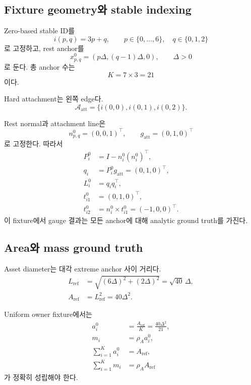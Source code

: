 \documentclass[11pt]{article}
\begin{document}
\subsection{Fixture geometry와 stable indexing}

Zero-based stable ID를
\begin{equation}
  i(p,q)=3p+q,
  \qquad
  p\in\{0,\ldots,6\},\quad q\in\{0,1,2\}
\end{equation}
로 고정하고, rest anchor를
\begin{equation}
  x_{p,q}^0
  =
  \left(p\Delta,(q-1)\Delta,0\right),
  \qquad \Delta>0
\end{equation}
로 둔다. 총 anchor 수는
\begin{equation}
  K=7\times3=21
\end{equation}
이다.

Hard attachment는 왼쪽 edge다.
\begin{equation}
  \mathcal A_{\mathrm{att}}
  =
  \{i(0,0),i(0,1),i(0,2)\}.
\end{equation}

Rest normal과 attachment line은
\begin{equation}
  n_{p,q}^0=(0,0,1)^\top,
  \qquad
  g_{\mathrm{att}}=(0,1,0)^\top
\end{equation}
로 고정한다. 따라서
\begin{align}
  P_i^0&=I-n_i^0(n_i^0)^\top,\\
  q_i&=P_i^0g_{\mathrm{att}}=(0,1,0)^\top,\\
  L_i^0&=q_iq_i^\top,\\
  t_{i1}^0&=(0,1,0)^\top,\\
  t_{i2}^0&=n_i^0\times t_{i1}^0=(-1,0,0)^\top.
\end{align}
이 fixture에서 gauge 결과는 모든 anchor에 대해 analytic ground truth를 가진다.

\subsection{Area와 mass ground truth}

Asset diameter는 대각 extreme anchor 사이 거리다.
\begin{align}
  L_{\mathrm{ref}}
  &=
  \sqrt{(6\Delta)^2+(2\Delta)^2}
  =\sqrt{40}\,\Delta,\\
  A_{\mathrm{ref}}
  &=L_{\mathrm{ref}}^2
  =40\Delta^2.
\end{align}

Uniform owner fixture에서는
\begin{align}
  a_i^0&=\frac{A_{\mathrm{ref}}}{K}
  =\frac{40\Delta^2}{21},\\
  m_i&=\rho_Aa_i^0,\\
  \sum_{i=1}^{K}a_i^0&=A_{\mathrm{ref}},\\
  \sum_{i=1}^{K}m_i&=\rho_AA_{\mathrm{ref}}
\end{align}
가 정확히 성립해야 한다.
\end{document}
